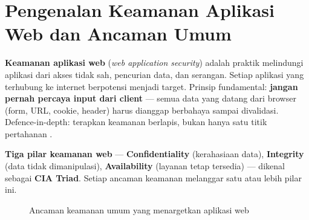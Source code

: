 ﻿\section{Pengenalan Keamanan Aplikasi Web dan Ancaman Umum}

\textbf{Keamanan aplikasi web} (\textit{web application security}) adalah praktik melindungi aplikasi dari akses tidak sah, pencurian data, dan serangan. Setiap aplikasi yang terhubung ke internet berpotensi menjadi target. Prinsip fundamental: \textbf{jangan pernah percaya input dari client} --- semua data yang datang dari browser (form, URL, cookie, header) harus dianggap berbahaya sampai divalidasi. Defence-in-depth: terapkan keamanan berlapis, bukan hanya satu titik pertahanan \cite{phpRightWay}.

\begin{konsep}
\textbf{Tiga pilar keamanan web} --- \textbf{Confidentiality} (kerahasiaan data), \textbf{Integrity} (data tidak dimanipulasi), \textbf{Availability} (layanan tetap tersedia) --- dikenal sebagai \textbf{CIA Triad}. Setiap ancaman keamanan melanggar satu atau lebih pilar ini.
\end{konsep}

\begin{figure}[H]
\centering
{}
\caption{Ancaman keamanan umum yang menargetkan aplikasi web}
\end{figure}

